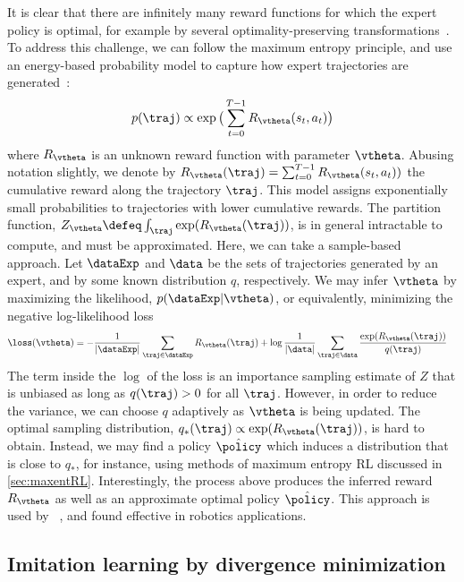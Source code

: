 It is clear that there are infinitely many reward functions for which the expert policy is optimal,
for example by several optimality-preserving transformations~\citep{Ng99}.
To address this challenge,
we can follow the maximum entropy principle,
and use an energy-based probability model
to capture how expert trajectories are
generated~\citep{Ziebart08}:
\begin{align}
p(\traj) \propto 
\exp\big(\sum_{t=0}^{T-1} R_{\vtheta}(s_t,a_t)\big)
\end{align}
where $R_{\vtheta}$ is an 
unknown reward function with parameter $\vtheta$.
Abusing notation slightly, we denote by
$R_{\vtheta}(\traj) = \sum_{t=0}^{T-1} R_{\vtheta}(s_t,a_t))$
the cumulative reward along the trajectory $\traj$.
This model assigns exponentially small probabilities
to trajectories with lower cumulative rewards.
The partition function,
$Z_{\vtheta} \defeq \int_{\traj}\exp(R_{\vtheta}(\traj))$,
is in general intractable to compute,
and must be approximated.
Here, we can take a sample-based approach.
Let $\dataExp$ and $\data$ be the sets of
trajectories generated by an expert,
and by some known distribution $q$, respectively.
We may infer $\vtheta$ by maximizing the likelihood,
$p(\dataExp|\vtheta)$,
or equivalently,
minimizing the negative log-likelihood loss
\begin{align}
\loss(\vtheta) &= -\frac{1}{|\dataExp|}\sum_{\traj\in\dataExp} R_{\vtheta}(\traj) + \log \frac{1}{|\data|}\sum_{\traj\in\data} \frac{\exp(R_{\vtheta}(\traj))}{q(\traj)}
\end{align}
The term inside the $\log$ of the loss is an
importance sampling estimate of $Z$
that is unbiased as long as $q(\traj)>0$ for all $\traj$.
However, in order to reduce the variance,
we can choose $q$ adaptively
as $\vtheta$ is being updated.
The optimal sampling distribution,
$q_*(\traj) \propto \exp(R_{\vtheta}(\traj))$,
is hard to obtain.  Instead, we may find
a policy $\hat{\policy}$
which induces a distribution that is close to $q_*$,
for instance, using methods of maximum entropy RL discussed in \cref{sec:maxentRL}.
Interestingly, the process above produces
the inferred reward $R_{\vtheta}$
as well as an approximate optimal policy $\hat{\policy}$.
This approach is used by ~\citep{Finn2018GCL},
and found effective in robotics applications.


\subsection{Imitation learning by divergence minimization}
\label{sec:ildm}

